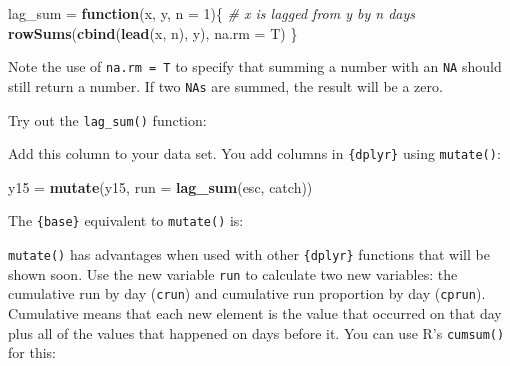 \documentclass[]{book}
\newenvironment{Shaded}{\begin{snugshade}}{\end{snugshade}}
\newcommand{\KeywordTok}[1]{\textcolor[rgb]{0.13,0.29,0.53}{\textbf{#1}}}
\newcommand{\DataTypeTok}[1]{\textcolor[rgb]{0.13,0.29,0.53}{#1}}
\newcommand{\DecValTok}[1]{\textcolor[rgb]{0.00,0.00,0.81}{#1}}
\newcommand{\StringTok}[1]{\textcolor[rgb]{0.31,0.60,0.02}{#1}}
\newcommand{\CommentTok}[1]{\textcolor[rgb]{0.56,0.35,0.01}{\textit{#1}}}
\newcommand{\ControlFlowTok}[1]{\textcolor[rgb]{0.13,0.29,0.53}{\textbf{#1}}}
\newcommand{\OperatorTok}[1]{\textcolor[rgb]{0.81,0.36,0.00}{\textbf{#1}}}
\newcommand{\NormalTok}[1]{#1}
\theoremstyle{definition}
\theoremstyle{definition}
\theoremstyle{definition}
\theoremstyle{remark}
\begin{document}
\begin{Shaded}
\begin{Highlighting}[]
\NormalTok{lag_sum =}\StringTok{ }\ControlFlowTok{function}\NormalTok{(x, y, }\DataTypeTok{n =} \DecValTok{1}\NormalTok{)\{}
  \CommentTok{# x is lagged from y by n days}
  \KeywordTok{rowSums}\NormalTok{(}\KeywordTok{cbind}\NormalTok{(}\KeywordTok{lead}\NormalTok{(x, n), y), }\DataTypeTok{na.rm =}\NormalTok{ T)}
\NormalTok{\}}
\end{Highlighting}
\end{Shaded}

Note the use of \texttt{na.rm\ =\ T} to specify that summing a number
with an \texttt{NA} should still return a number. If two \texttt{NAs}
are summed, the result will be a zero.

Try out the \texttt{lag\_sum()} function:

\begin{Shaded}
\end{Shaded}

Add this column to your data set. You add columns in \texttt{\{dplyr\}}
using \texttt{mutate()}:

\begin{Shaded}
\begin{Highlighting}[]
\NormalTok{y15 =}\StringTok{ }\KeywordTok{mutate}\NormalTok{(y15, }\DataTypeTok{run =} \KeywordTok{lag_sum}\NormalTok{(esc, catch))}
\end{Highlighting}
\end{Shaded}

The \texttt{\{base\}} equivalent to \texttt{mutate()} is:

\begin{Shaded}
\end{Shaded}

\texttt{mutate()} has advantages when used with other \texttt{\{dplyr\}}
functions that will be shown soon. Use the new variable \texttt{run} to
calculate two new variables: the cumulative run by day (\texttt{crun})
and cumulative run proportion by day (\texttt{cprun}). Cumulative means
that each new element is the value that occurred on that day plus all of
the values that happened on days before it. You can use R's
\texttt{cumsum()} for this:
\end{document}
